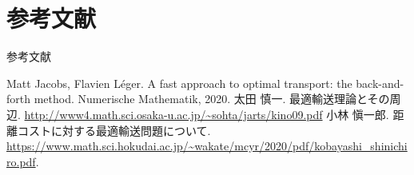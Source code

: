 \documentclass[aspectratio=169, dvipdfmx, 12pt]{beamer}
\begin{document}
\section{参考文献}
\begin{frame}{参考文献}
    \begin{thebibliography}{3}
        Matt Jacobs, Flavien Léger.
        \newblock A fast approach to optimal transport: the back-and-forth method.
        \newblock Numerische Mathematik, 2020. 
        太田 慎一.
        \newblock 最適輸送理論とその周辺.
        \newblock \url{http://www4.math.sci.osaka-u.ac.jp/~sohta/jarts/kino09.pdf}
        小林 愼一郎.
        \newblock 距離コストに対する最適輸送問題について.
        \newblock \url{https://www.math.sci.hokudai.ac.jp/~wakate/mcyr/2020/pdf/kobayashi_shinichiro.pdf}.
    \end{thebibliography}
\end{frame}
\end{document}
